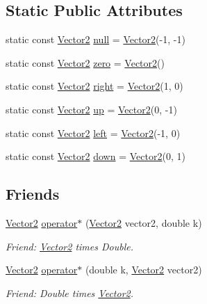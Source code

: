 \subsection*{Static Public Attributes}
\begin{DoxyCompactItemize}
\item 
static const \mbox{\hyperlink{struct_vector2}{Vector2}} \mbox{\hyperlink{struct_vector2_a2c6e0149051082f87c4f63f97e07c7ae}{null}} = \mbox{\hyperlink{struct_vector2}{Vector2}}(-\/1, -\/1)
\item 
static const \mbox{\hyperlink{struct_vector2}{Vector2}} \mbox{\hyperlink{struct_vector2_a28849e17f54c1c995f035544b5fd0a5f}{zero}} = \mbox{\hyperlink{struct_vector2}{Vector2}}()
\item 
static const \mbox{\hyperlink{struct_vector2}{Vector2}} \mbox{\hyperlink{struct_vector2_aa9712253176cedb918592990df5ea611}{right}} = \mbox{\hyperlink{struct_vector2}{Vector2}}(1, 0)
\item 
static const \mbox{\hyperlink{struct_vector2}{Vector2}} \mbox{\hyperlink{struct_vector2_a0de964f9acb5cc8669d0b3b9f5b9d4eb}{up}} = \mbox{\hyperlink{struct_vector2}{Vector2}}(0, -\/1)
\item 
static const \mbox{\hyperlink{struct_vector2}{Vector2}} \mbox{\hyperlink{struct_vector2_aaad26bbee0364de1e6a8676215886a2f}{left}} = \mbox{\hyperlink{struct_vector2}{Vector2}}(-\/1, 0)
\item 
static const \mbox{\hyperlink{struct_vector2}{Vector2}} \mbox{\hyperlink{struct_vector2_a64cb9ddeb42abbcfa527c3e2660ffef9}{down}} = \mbox{\hyperlink{struct_vector2}{Vector2}}(0, 1)
\end{DoxyCompactItemize}
\subsection*{Friends}
\begin{DoxyCompactItemize}
\item 
\mbox{\hyperlink{struct_vector2}{Vector2}} \mbox{\hyperlink{struct_vector2_a489f5283f5f1dc905c57d0a40d98c1af}{operator$\ast$}} (\mbox{\hyperlink{struct_vector2}{Vector2}} vector2, double k)
\begin{DoxyCompactList}\small\item\em Friend\+: \mbox{\hyperlink{struct_vector2}{Vector2}} times Double. \end{DoxyCompactList}\item 
\mbox{\hyperlink{struct_vector2}{Vector2}} \mbox{\hyperlink{struct_vector2_a6ac6360b23e2a1457b794f0aefc18f3a}{operator$\ast$}} (double k, \mbox{\hyperlink{struct_vector2}{Vector2}} vector2)
\begin{DoxyCompactList}\small\item\em Friend\+: Double times \mbox{\hyperlink{struct_vector2}{Vector2}}. \end{DoxyCompactList}\end{DoxyCompactItemize}


